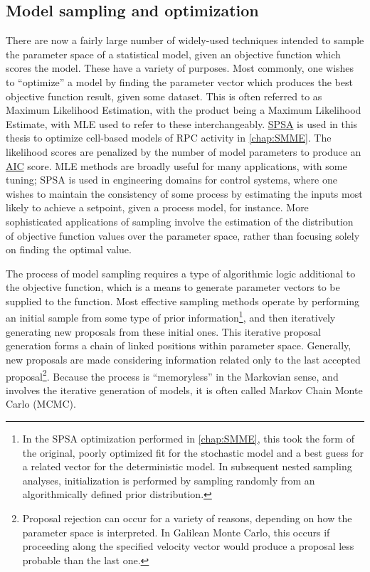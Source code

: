 \subsection{Model sampling and optimization}
There are now a fairly large number of widely-used techniques intended to sample the parameter space of a statistical model, given an objective function which scores the model. These have a variety of purposes. Most commonly, one wishes to ``optimize'' a model by finding the parameter vector which produces the best objective function result, given some dataset. This is often referred to as Maximum Likelihood Estimation, with the product being a Maximum Likelihood Estimate, with MLE used to refer to these interchangeably. \hyperref[SPSA]{SPSA} is used in this thesis to optimize cell-based models of RPC activity in \autoref{chap:SMME}. The likelihood scores are penalized by the number of model parameters to produce an \hyperref[AIC]{AIC} score. MLE methods are broadly useful for many applications, with some tuning; SPSA is used in engineering domains for control systems, where one wishes to maintain the consistency of some process by estimating the inputs most likely to achieve a setpoint, given a process model, for instance. More sophisticated applications of sampling involve the estimation of the distribution of objective function values over the parameter space, rather than focusing solely on finding the optimal value.

The process of model sampling requires a type of algorithmic logic additional to the objective function, which is a means to generate parameter vectors to be supplied to the function. Most effective sampling methods operate by performing an initial sample from some type of prior information\footnote{In the SPSA optimization performed in \autoref{chap:SMME}, this took the form of the original, poorly optimized fit for the stochastic model and a best guess for a related vector for the deterministic model. In subsequent nested sampling analyses, initialization is performed by sampling randomly from an algorithmically defined prior distribution.}, and then iteratively generating new proposals from these initial ones. This iterative proposal generation forms a chain of linked positions within parameter space. Generally, new proposals are made considering information related only to the last accepted proposal\footnote{Proposal rejection can occur for a variety of reasons, depending on how the parameter space is interpreted. In Galilean Monte Carlo, this occurs if proceeding along the specified velocity vector would produce a proposal less probable than the last one.}. Because the process is ``memoryless'' in the Markovian sense, and involves the iterative generation of models, it is often called Markov Chain Monte Carlo (MCMC).

